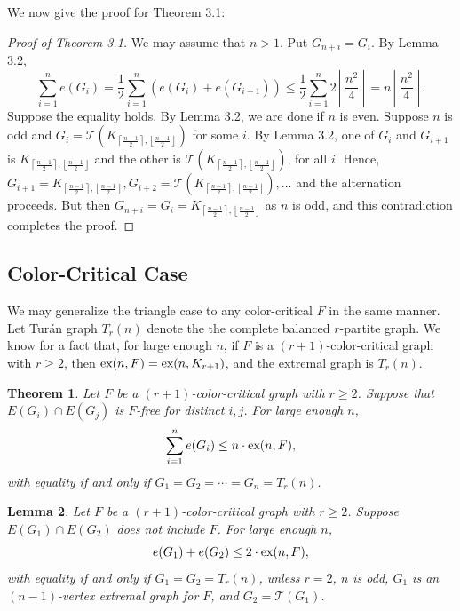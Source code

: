 \documentclass[a4paper]{article}
\newtheorem{theorem}{Theorem}[section]
\newtheorem{lemma}[theorem]{Lemma}
\begin{document}
We now give the proof for Theorem 3.1:

\begin{proof}[Proof of Theorem 3.1]
  We may assume that $n > 1$. Put $G_{n + i} = G_i$. By Lemma 3.2,
  \[
    \sum_{i = 1}^n e(G_i) = \frac{1}{2}\sum_{i = 1}^n (e(G_i) + e(G_{i + 1})) \leq \frac{1}{2}\sum_{i = 1}^n 2\left\lfloor\frac{n^2}{4}\right\rfloor = n\left\lfloor\frac{n^2}{4}\right\rfloor.
  \]
  Suppose the equality holds. By Lemma 3.2, we are done if $n$ is even. Suppose $n$ is odd and $G_i
   = \mathcal{T}(K_{\left\lceil\frac{n -
  1}{2}\right\rceil, \left\lfloor\frac{n - 1}{2}\right\rfloor})$ for some $i$. By Lemma 3.2, one of $G_i$ and $G_{i + 1}$ is
   $K_{\left\lceil\frac{n - 1}{2}\right\rceil, \left\lfloor\frac{n - 1}{2}\right\rfloor}$ and the
   other is $\mathcal{T}(K_{\left\lceil\frac{n -
  1}{2}\right\rceil, \left\lfloor\frac{n - 1}{2}\right\rfloor})$, for all $i$. Hence, $G_{i + 1} = K_{\left\lceil\frac{n -
   1}{2}\right\rceil, \left\lfloor\frac{n - 1}{2}\right\rfloor}, G_{i + 2} = \mathcal{T}(K_{\left\lceil\frac{n -
  1}{2}\right\rceil, \left\lfloor\frac{n - 1}{2}\right\rfloor}), \ldots$
   and the alternation proceeds. But then $G_{n + i} = G_i = K_{\left\lceil\frac{n -
   1}{2}\right\rceil, \left\lfloor\frac{n - 1}{2}\right\rfloor}$ as $n$ is odd, and this
   contradiction completes the proof.
\end{proof}

\subsection{Color-Critical Case}

We may generalize the triangle case to any color-critical $F$ in the same manner. Let Turán graph
$T_r(n)$ denote the the complete balanced $r$-partite graph. We know for a fact that, for large
enough $n$, if $F$ is a $(r + 1)$-color-critical graph with $r \geq 2$, then $\textnormal{ex}(n, F)
= \textnormal{ex}(n, K_{r + 1})$, and the extremal graph is $T_r(n)$.

\begin{theorem}
  Let $F$ be a $(r + 1)$-color-critical graph with $r \geq 2$. Suppose that $E(G_i) \cap E(G_j)$ is
  $F$-free for distinct $i, j$. For large enough $n$,
  \[
    \sum_{i = 1}^n e(G_i) \leq n \cdot \textnormal{ex}(n, F),
  \]
  with equality if and only if $G_1 = G_2 = \cdots = G_n = T_r(n)$.
\end{theorem}

\begin{lemma}
  Let $F$ be a $(r + 1)$-color-critical graph with $r \geq 2$. Suppose $E(G_1) \cap E(G_2)$ does not
  include $F$. For large enough $n$,
  \[
    e(G_1) + e(G_2) \leq 2 \cdot \textnormal{ex}(n, F),
  \]
  with equality if and only if $G_1 = G_2 = T_r(n)$, unless $r = 2$, $n$ is odd, $G_1$ is an $(n -
  1)$-vertex extremal graph for $F$, and $G_2 = \mathcal{T}(G_1)$. 
\end{lemma}
\end{document}
